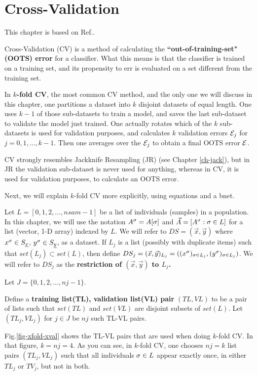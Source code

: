 \chapter{Cross-Validation}
\label{ch-cross-val}

This chapter is based on Ref.\cite{wiki-xval}.

Cross-Validation (CV)
is a method 
of calculating the 
{\bf ``out-of-training-set" (OOTS) error}
for a classifier.
What this means is that the classifier 
is trained on a training set,
and its propensity to err is evaluated
on a set different from the training set.

In {\bf $k$-fold CV}, the most common CV method, 
and the only one we will discuss in this chapter,
one
partitions a  
dataset into $k$ disjoint datasets
of equal length.
One uses $k-1$ of those
sub-datasets to train a model,
and saves the last sub-dataset to
validate the model just trained.
One actually rotates which of 
the $k$ sub-datasets is used 
for validation purposes,
and calculates $k$ validation 
errors ${\cal E}_j$ for $j=0, 1, \ldots, k-1$.
Then one averages over the ${\cal E}_j$
to obtain a final OOTS error ${\cal E}$. 

CV strongly resembles
Jackknife
Resampling (JR) 
(see Chapter \ref{ch-jack}),
but in JR 
the validation sub-dataset is
never used for anything,
whereas in CV,
it is used for validation
purposes, to calculate
an OOTS error.

Next, we will
explain $k$-fold CV more explicitly,
using 
equations and a bnet.


Let $L=[0,1,2, \ldots, nsam-1]$ be a list of
individuals (samples) in a population.
In this chapter, we will use the notation 
$A^\sigma=A[\sigma]$ 
and $\vec{A}=[A^\sigma:\sigma\in L]$
for a  list (vector, 1-D  array) indexed by $L$.
We will refer to $DS=(\vec{x}, \vec{y})$ 
where $x^\sigma\in S_{\underline{x}}$, $y^\sigma\in S_{\underline{y}}$,
as a dataset.
If
$L_j$ is a list (possibly with 
duplicate items)
such that $set(L_j)\subset set(L)$, then
define
$DS_j=(\vec{x}, \vec{y})_{L_j}=
((x^\sigma)_{\sigma\in L_j}, 
(y^\sigma)_{\sigma\in L_j})$.
We will
refer to $DS_j$
as the {\bf restriction of 
$(\vec{x}, \vec{y})$ to $L_j$.}

Let
$J=\{0,1, 2, \ldots, nj-1\}$.

Define a {\bf training list(TL),
validation list(VL) pair} $(TL,VL)$
to be a pair of lists
such that 
$set(TL)$ and $set(VL)$
are disjoint subsets
of $set(L)$.
Let $(TL_j, VL_j)$ for $j\in J$
be $nj$ such TL-VL pairs.


Fig.\ref{fig-xfold-xval} 
shows
the TL-VL pairs 
that are used
when doing $k$-fold 
CV.
In that figure, $k=nj=4$.
As you can see,
in $k$-fold CV, one chooses 
$nj=k$ list pairs $(TL_j, VL_j)$
such that all individuals $\sigma\in L$
appear exactly once, in either
$TL_j$ or $TV_j$, but not in both.

